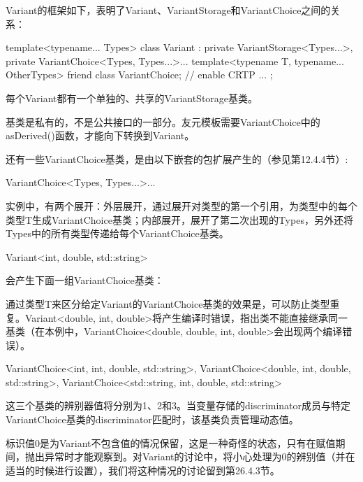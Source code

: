 Variant的框架如下，表明了Variant、VariantStorage和VariantChoice之间的关系：

\begin{cpp}
template<typename... Types>
class Variant
	: private VariantStorage<Types...>,
	private VariantChoice<Types, Types...>...
{
	template<typename T, typename... OtherTypes>
		friend class VariantChoice; // enable CRTP
	...
};
\end{cpp}

每个Variant都有一个单独的、共享的VariantStorage基类。

\begin{notice}
基类是私有的，不是公共接口的一部分。友元模板需要VariantChoice中的asDerived()函数，才能向下转换到Variant。
\end{notice}

还有一些VariantChoice基类，是由以下嵌套的包扩展产生的（参见第12.4.4节）:

\begin{cpp}
VariantChoice<Types, Types...>...
\end{cpp}

实例中，有两个展开：外层展开，通过展开对类型的第一个引用，为类型中的每个类型T生成VariantChoice基类；内部展开，展开了第二次出现的Types，另外还将Types中的所有类型传递给每个VariantChoice基类。

\begin{cpp}
Variant<int, double, std::string>
\end{cpp}

会产生下面一组VariantChoice基类：

\begin{notice}
通过类型T来区分给定Variant的VariantChoice基类的效果是，可以防止类型重复。Variant<double, int, double>将产生编译时错误，指出类不能直接继承同一基类（在本例中，VariantChoice<double, double, int, double>会出现两个编译错误）。
\end{notice}

\begin{cpp}
VariantChoice<int, int, double, std::string>,
VariantChoice<double, int, double, std::string>,
VariantChoice<std::string, int, double, std::string>
\end{cpp}

这三个基类的辨别器值将分别为1、2和3。当变量存储的discriminator成员与特定VariantChoice基类的discriminator匹配时，该基类负责管理动态值。

标识值0是为Variant不包含值的情况保留，这是一种奇怪的状态，只有在赋值期间，抛出异常时才能观察到。对Variant的讨论中，将小心处理为0的辨别值（并在适当的时候进行设置），我们将这种情况的讨论留到第26.4.3节。

